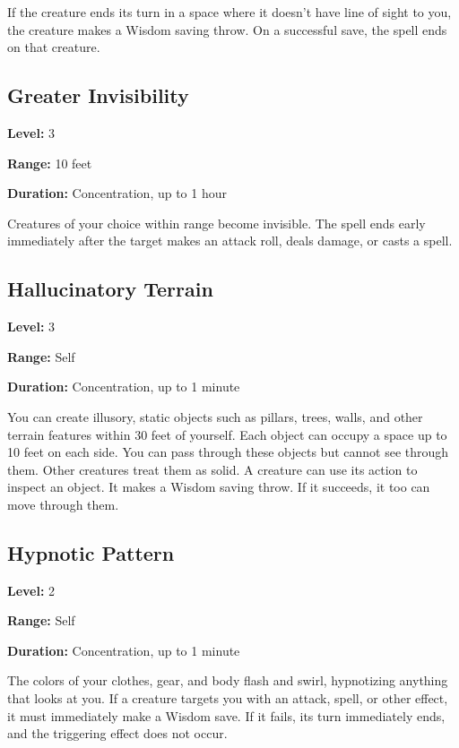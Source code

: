 \documentclass[12pt,letterpaper,twocolumn,openany,nodeprecatedcode,bg=none]{dndbook}
\let\oldsubsection\subsection
\renewcommand{\subsection}[1]{%
  \needspace{5\baselineskip}%
  \oldsubsection{#1}%
}
\begin{document}
If the creature ends its turn in a space where it doesn't have line of
sight to you, the creature makes a Wisdom saving throw. On a successful
save, the spell ends on that creature.

\subsection{Greater Invisibility}\label{greater-invisibility}

\textbf{Level:} 3

\textbf{Range:} 10 feet

\textbf{Duration:} Concentration, up to 1 hour

Creatures of your choice within range become invisible. The spell ends
early immediately after the target makes an attack roll, deals damage,
or casts a spell.

\subsection{Hallucinatory Terrain}\label{hallucinatory-terrain}

\textbf{Level:} 3

\textbf{Range:} Self

\textbf{Duration:} Concentration, up to 1 minute

You can create illusory, static objects such as pillars, trees, walls,
and other terrain features within 30 feet of yourself. Each object can
occupy a space up to 10 feet on each side. You can pass through these
objects but cannot see through them. Other creatures treat them as
solid. A creature can use its action to inspect an object. It makes a
Wisdom saving throw. If it succeeds, it too can move through them.

\subsection{Hypnotic Pattern}\label{hypnotic-pattern}

\textbf{Level:} 2

\textbf{Range:} Self

\textbf{Duration:} Concentration, up to 1 minute

The colors of your clothes, gear, and body flash and swirl, hypnotizing
anything that looks at you. If a creature targets you with an attack,
spell, or other effect, it must immediately make a Wisdom save. If it
fails, its turn immediately ends, and the triggering effect does not
occur.
\end{document}
